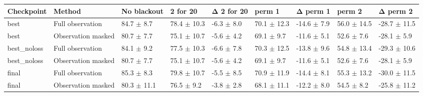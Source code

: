 \begin{tabular}{lllllllll}
\toprule
Checkpoint & Method & No blackout & 2 for 20 & Δ 2 for 20 & perm  1 & Δ perm  1 & perm  2 & Δ perm  2 \\
\midrule
best & Full observation & 84.7 $\pm$ 8.7 & 78.4 $\pm$ 10.3 & -6.3 $\pm$ 8.0 & 70.1 $\pm$ 12.3 & -14.6 $\pm$ 7.9 & 56.0 $\pm$ 14.5 & -28.7 $\pm$ 11.5 \\
best & Observation masked & 80.7 $\pm$ 7.7 & 75.1 $\pm$ 10.7 & -5.6 $\pm$ 4.2 & 69.1 $\pm$ 9.7 & -11.6 $\pm$ 5.1 & 52.6 $\pm$ 7.6 & -28.1 $\pm$ 5.9 \\
best\_noloss & Full observation & 84.1 $\pm$ 9.2 & 77.5 $\pm$ 10.3 & -6.6 $\pm$ 7.8 & 70.3 $\pm$ 12.5 & -13.8 $\pm$ 9.6 & 54.8 $\pm$ 13.4 & -29.3 $\pm$ 10.6 \\
best\_noloss & Observation masked & 80.7 $\pm$ 7.7 & 75.1 $\pm$ 10.7 & -5.6 $\pm$ 4.2 & 69.1 $\pm$ 9.7 & -11.6 $\pm$ 5.1 & 52.6 $\pm$ 7.6 & -28.1 $\pm$ 5.9 \\
final & Full observation & 85.3 $\pm$ 8.3 & 79.8 $\pm$ 10.7 & -5.5 $\pm$ 8.5 & 70.9 $\pm$ 11.9 & -14.4 $\pm$ 8.1 & 55.3 $\pm$ 13.2 & -30.0 $\pm$ 11.5 \\
final & Observation masked & 80.3 $\pm$ 11.1 & 76.5 $\pm$ 9.2 & -3.8 $\pm$ 2.8 & 68.1 $\pm$ 11.1 & -12.2 $\pm$ 8.0 & 54.5 $\pm$ 8.2 & -25.8 $\pm$ 11.2 \\
\bottomrule
\end{tabular}
